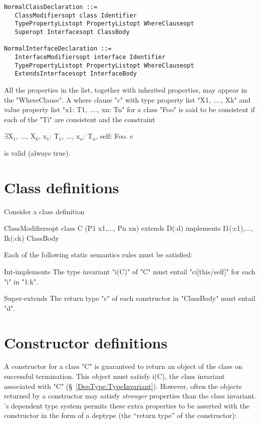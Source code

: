 \begin{verbatim}
NormalClassDeclaration ::= 
   ClassModifiersopt class Identifier 
   TypePropertyListopt PropertyListopt WhereClauseopt
   Superopt Interfacesopt ClassBody

NormalInterfaceDeclaration ::= 
   InterfaceModifiersopt interface Identifier 
   TypePropertyListopt PropertyListopt WhereClauseopt
   ExtendsInterfacesopt InterfaceBody
\end{verbatim}

All the properties in the list, together with inherited properties,
may appear in the \xcd"WhereClause". A where clause \xcd"c" with
type property list \xcd"X1, ...., Xk"
and value property list \xcd"x1: T1, ...., xn: Tn"
for a class \xcd"Foo" is said to be consistent if each of the \xcd"Ti" are
consistent and the constraint
\begin{xtenmath}
$\exists$X$_1$, $\dots$, X$_k$, x$_1$: T$_1$, $\dots$, x$_n$: T$_n$, self: Foo. c
\end{xtenmath}
\noindent is valid (always true).

\section{Class definitions}

Consider a class definition
\begin{xten}
ClassModifiersopt 
 class C (P1 x1,..., Pn xn)  extends D(:d) 
   implements I1(:c1),..., Ik(:ck)
 ClassBody  
\end{xten}

Each of the following static semantics rules must be satisfied:

\begin{staticrule}{Int-implements}
The type invariant \xcd"i(C)" of \xcd"C" must entail
\xcd"ci[this/self]" for each \xcd"i" in \xcd"1:k".  
\end{staticrule}

\begin{staticrule}{Super-extends}
The return type \xcd"c" of each constructor in \xcd"ClassBody"
must entail \xcd"d".
\end{staticrule}

\section{Constructor definitions}

A constructor for a class \xcd"C" is guaranteed to return an object of the
class on successful termination. This object must satisfy i(C), the
class invariant associated with \xcd"C" (\S~\ref{DepType:TypeInvariant}). However,
often the objects returned by a constructor may satisfy {\em stronger}
properties than the class invariant. \Xten{}'s dependent type system
permits these extra properties to be asserted with the constructor in
the form of a deptype (the ``return type'' of the constructor):

